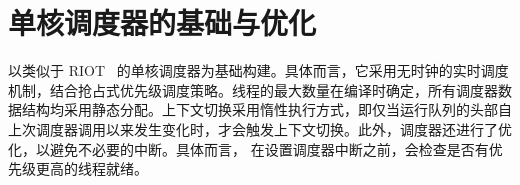 \section{单核调度器的基础与优化}
\label{sec:single-core}

\iffalse

\noteEF{Proposal: Summarize whole section in a single paragraph that just describes the optimized single-core scheduler, remove reference to RIOT-rs as "prior" work \& benchmarks}
\noteEB{Good idea. Let's do that.}


\fi

\OSname{} 以类似于 RIOT~\cite{baccelli2018riot} 的单核调度器为基础构建。具体而言，它采用无时钟的实时调度机制，结合抢占式优先级调度策略。线程的最大数量在编译时确定，所有调度器数据结构均采用静态分配。上下文切换采用惰性执行方式，即仅当运行队列的头部自上次调度器调用以来发生变化时，才会触发上下文切换。此外，调度器还进行了优化，以避免不必要的中断。具体而言，\OSname{} 在设置调度器中断之前，会检查是否有优先级更高的线程就绪。

